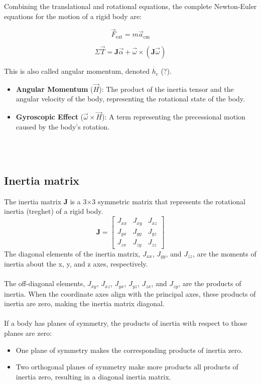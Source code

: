 Combining the translational and rotational equations, the complete Newton-Euler equations for the motion of a rigid body are:

\[
\vec{F}_{\text{ext}} = m \vec{a}_{\text{cm}}
\]

\begin{equation}
\Sigma\vec{T} = \mathbf{J} \vec{\alpha} + \vec{\omega} \times (\mathbf{J} \vec{\omega})
\end{equation}

This is also called angular momentum, denoted \( \dot{h_c}\) (?).

\begin{itemize}
    \item \textbf{Angular Momentum} (\( \vec{H} \)): The product of the inertia tensor and the angular velocity of the body, representing the rotational state of the body.
    \item \textbf{Gyroscopic Effect} (\( \vec{\omega} \times \vec{H} \)): A term representing the precessional motion caused by the body's rotation.
\end{itemize}
\\
\\
\subsection{Inertia matrix}
The inertia matrix \textbf{J} is a 3×3 symmetric matrix that represents the rotational inertia (treghet) of a rigid body. 
\[
\mathbf{J} = \begin{bmatrix}
    J_{xx} & J_{xy} & J_{xz} \\
    J_{yx} & J_{yy} & J_{yz} \\
    J_{zx} & J_{zy} & J_{zz}
\end{bmatrix}
\]
The diagonal elements of the inertia matrix, \( J_{xx} \), \( J_{yy} \), and \( J_{zz} \), are the moments of inertia about the x, y, and z axes, respectively. 
\\
\\
The off-diagonal elements, \( J_{xy} \), \( J_{xz} \), \( J_{yx} \), \( J_{yz} \), \( J_{zx} \), and \( J_{zy} \), are the products of inertia. When the coordinate axes align with the principal axes, these products of inertia are zero, making the inertia matrix diagonal.
\\
\\
If a body has planes of symmetry, the products of inertia with respect to those planes are zero:
\begin{itemize}
    \item One plane of symmetry makes the corresponding products of inertia zero.
    \item Two orthogonal planes of symmetry make more products all products of inertia zero, resulting in a diagonal inertia matrix.
\end{itemize}

